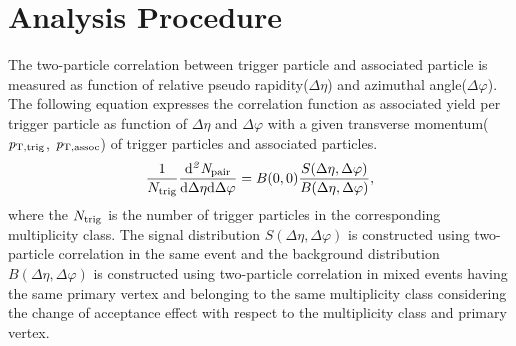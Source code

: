\section{Analysis Procedure}
\label{sec:ana}

The two-particle correlation between trigger particle and associated particle is measured as function of relative pseudo rapidity($\Delta\eta$) and azimuthal angle($\Delta\varphi$). The following equation expresses the correlation function as associated yield per trigger particle as function of $\Delta\eta$ and $\Delta\varphi$ with a given transverse momentum($\it{p}_{\rm{T, trig}}$, $\it{p}_{\rm{T, assoc}}$) of trigger particles and associated particles.
\begin{eqnarray}
\frac{1}{N_{\rm{trig}}} \frac{ \rm{d}\it{}^{2} N_{\rm{pair}} }{ \rm{d} \Delta\eta \rm{d}\Delta\varphi} = B(0, 0)\frac{S(\Delta\eta, \Delta\varphi)}{B(\Delta\eta, \Delta\varphi)},
\end{eqnarray}
where the $N_{\rm{trig}}$ is the number of trigger particles in the corresponding multiplicity class. The signal distribution $S(\Delta\eta, \Delta\varphi)$ is constructed using two-particle correlation in the same event and the background distribution $B(\Delta\eta, \Delta\varphi)$ is constructed using two-particle correlation in mixed events having the same primary vertex and belonging to the same multiplicity class considering the change of acceptance effect with respect to the multiplicity class and primary vertex.

